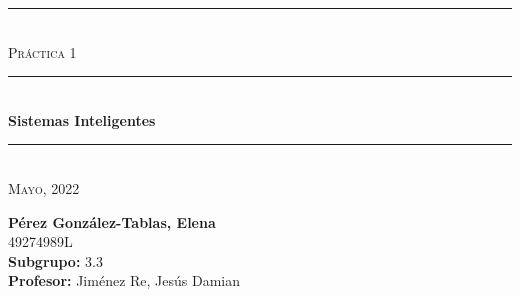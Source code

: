 \begin{titlepage}
	\begin{center}
		\rule{15cm}{0pt} \\
		[3cm]
		\textsc{\Large Práctica 1} \\
		\rule{15cm}{1pt} \\
		[0.25cm]
		\huge{\bfseries Sistemas Inteligentes} \\
		\rule{15cm}{1pt} \\
		[0.25cm]
		\textsc{\Large Mayo, 2022}\\
		[9cm]
	\end{center}
	\begin{flushright}
		\textbf{Pérez González-Tablas, Elena} \\
		[0.25cm]
		49274989L \\
		[0.25cm]
		\textbf{Subgrupo:} 3.3 \\
		[0.25cm]
		\textbf{Profesor:} Jiménez Re, Jesús Damian\\
	\end{flushright}
\end{titlepage}
\newpage
\begin{titlepage}
	\begin{flushleft}
	\end{flushleft}
\end{titlepage}